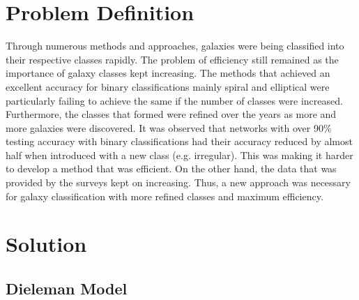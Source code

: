 \documentclass[a4paper,12pt]{report}
\begin{document}
\chapter{Problem Definition}
\hspace*{0.5 in}Through numerous methods and approaches, galaxies were being classified into their respective classes rapidly. The problem of efficiency still remained as the importance of galaxy classes kept increasing. The methods that achieved an excellent accuracy for binary classifications mainly spiral and elliptical were particularly failing to achieve the same if the number of classes were increased. Furthermore, the classes that formed were refined over the years as more and more galaxies were discovered. It was observed that networks with over 90\% testing accuracy with binary classifications had their accuracy reduced by almost half when introduced with a new class (e.g. irregular). This was making it harder to develop a method that was efficient. On the other hand, the data that was provided by the surveys kept on increasing. Thus, a new approach was necessary for galaxy classification with more refined classes and maximum efficiency.
\chapter{Solution}
\section{Dieleman Model}
\end{document}
